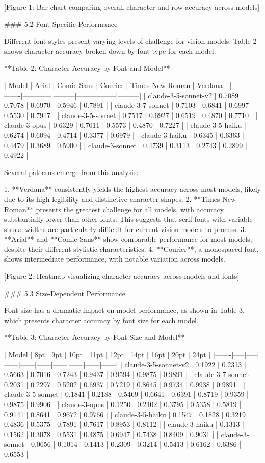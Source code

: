 \documentclass{article}
\begin{document}
[Figure 1: Bar chart comparing overall character and row accuracy across models]

### 5.2 Font-Specific Performance

Different font styles present varying levels of challenge for vision models. Table 2 shows character accuracy broken down by font type for each model.

**Table 2: Character Accuracy by Font and Model**

| Model | Arial | Comic Sans | Courier | Times New Roman | Verdana |
|-------|-------|------------|---------|-----------------|---------|
| claude-3-5-sonnet-v2 | 0.7089 | 0.7078 | 0.6970 | 0.5946 | 0.7891 |
| claude-3-7-sonnet | 0.7103 | 0.6841 | 0.6997 | 0.5530 | 0.7917 |
| claude-3-5-sonnet | 0.7517 | 0.6927 | 0.6519 | 0.4870 | 0.7710 |
| claude-3-opus | 0.6329 | 0.7011 | 0.5573 | 0.4870 | 0.7227 |
| claude-3-5-haiku | 0.6274 | 0.6094 | 0.4714 | 0.3377 | 0.6979 |
| claude-3-haiku | 0.6345 | 0.6363 | 0.4479 | 0.3689 | 0.5900 |
| claude-3-sonnet | 0.4739 | 0.3113 | 0.2743 | 0.2899 | 0.4922 |

Several patterns emerge from this analysis:

1. **Verdana** consistently yields the highest accuracy across most models, likely due to its high legibility and distinctive character shapes.
2. **Times New Roman** presents the greatest challenge for all models, with accuracy substantially lower than other fonts. This suggests that serif fonts with variable stroke widths are particularly difficult for current vision models to process.
3. **Arial** and **Comic Sans** show comparable performance for most models, despite their different stylistic characteristics.
4. **Courier**, a monospaced font, shows intermediate performance, with notable variation across models.

[Figure 2: Heatmap visualizing character accuracy across models and fonts]

### 5.3 Size-Dependent Performance

Font size has a dramatic impact on model performance, as shown in Table 3, which presents character accuracy by font size for each model.

**Table 3: Character Accuracy by Font Size and Model**

| Model | 8pt | 9pt | 10pt | 11pt | 12pt | 14pt | 16pt | 20pt | 24pt |
|-------|-----|-----|------|------|------|------|------|------|------|
| claude-3-5-sonnet-v2 | 0.1922 | 0.2313 | 0.5663 | 0.7016 | 0.7243 | 0.9437 | 0.9594 | 0.9875 | 0.9891 |
| claude-3-7-sonnet | 0.2031 | 0.2297 | 0.5202 | 0.6937 | 0.7219 | 0.8645 | 0.9734 | 0.9938 | 0.9891 |
| claude-3-5-sonnet | 0.1841 | 0.2188 | 0.5469 | 0.6641 | 0.6391 | 0.8719 | 0.9359 | 0.9875 | 0.9906 |
| claude-3-opus | 0.1250 | 0.2402 | 0.3795 | 0.5358 | 0.5819 | 0.9141 | 0.8641 | 0.9672 | 0.9766 |
| claude-3-5-haiku | 0.1547 | 0.1828 | 0.3219 | 0.4836 | 0.5375 | 0.7891 | 0.7617 | 0.8953 | 0.8112 |
| claude-3-haiku | 0.1313 | 0.1562 | 0.3078 | 0.5531 | 0.4875 | 0.6947 | 0.7438 | 0.8409 | 0.9031 |
| claude-3-sonnet | 0.0656 | 0.1014 | 0.1413 | 0.2309 | 0.3214 | 0.5413 | 0.6162 | 0.6386 | 0.6553 |
\end{document}
